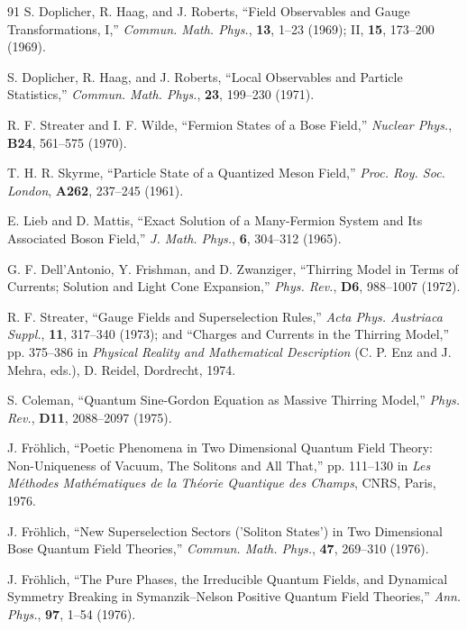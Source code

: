 \begin{thebibliography}{91}
S. Doplicher, R. Haag, and J. Roberts, ``Field Observables and Gauge
Transformations, I,'' \emph{Commun. Math. Phys.}, \textbf{13}, 1--23 (1969);
II, \textbf{15}, 173--200 (1969).

S. Doplicher, R. Haag, and J. Roberts, ``Local Observables and Particle
Statistics,'' \emph{Commun. Math. Phys.}, \textbf{23}, 199--230 (1971).

R. F. Streater and I. F. Wilde, ``Fermion States of a Bose Field,''
\emph{Nuclear Phys.}, \textbf{B24}, 561--575 (1970).

T. H. R. Skyrme, ``Particle State of a Quantized Meson Field,'' \emph{Proc.
Roy. Soc. London}, \textbf{A262}, 237--245 (1961).

E. Lieb and D. Mattis, ``Exact Solution of a Many-Fermion System and Its
Associated Boson Field,'' \emph{J. Math. Phys.}, \textbf{6}, 304--312 (1965).

G. F. Dell'Antonio, Y. Frishman, and D. Zwanziger, ``Thirring Model in Terms
of Currents; Solution and Light Cone Expansion,'' \emph{Phys. Rev.},
\textbf{D6}, 988--1007 (1972).

R. F. Streater, ``Gauge Fields and Superselection Rules,'' \emph{Acta Phys.
Austriaca Suppl.}, \textbf{11}, 317--340 (1973); and ``Charges and Currents in
the Thirring Model,'' pp. 375--386 in \emph{Physical Reality and Mathematical
Description} (C. P. Enz and J. Mehra, eds.), D. Reidel, Dordrecht, 1974.

S. Coleman, ``Quantum Sine-Gordon Equation as Massive Thirring Model,''
\emph{Phys. Rev.}, \textbf{D11}, 2088--2097 (1975).

J. Fr\"ohlich, ``Poetic Phenomena in Two Dimensional Quantum Field Theory:
Non-Uniqueness of Vacuum, The Solitons and All That,'' pp. 111--130 in
\emph{Les M\'ethodes Math\'ematiques de la Th\'eorie Quantique des Champs},
CNRS, Paris, 1976.

J. Fr\"ohlich, ``New Superselection Sectors ('Soliton States') in Two
Dimensional Bose Quantum Field Theories,'' \emph{Commun. Math. Phys.},
\textbf{47}, 269--310 (1976).

J. Fr\"ohlich, ``The Pure Phases, the Irreducible Quantum Fields, and
Dynamical Symmetry Breaking in Symanzik--Nelson Positive Quantum Field
Theories,'' \emph{Ann. Phys.}, \textbf{97}, 1--54 (1976).


\end{thebibliography}
